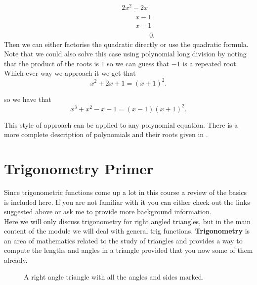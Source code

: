 \begin{warpHTML}
\begin{align*}
&\phantom{++}\underline{2x^{2}-2x}\\
&\phantom{++++}x-1\\
&\phantom{++++}\underline{x-1}\\
&\phantom{++++++}0.
\end{align*}
Then we can either factorise the quadratic directly or use the quadratic formula. Note that we could also solve this case using polynomial long division by noting that the product of the roots is $1$ so we can guess that $-1$ is a repeated root. Which ever way we approach it we get that
\begin{equation*}
x^{2}+2x+1=(x+1)^{2}.
\end{equation*}
\end{warpHTML}

so we have that
\begin{equation*}
x^{3}+x^{2}-x-1=(x-1)(x+1)^{2}.
\end{equation*}

This style of approach can be applied to any polynomial equation. There is a more complete description of polynomials and their roots given in \cite{algI}.

\section{Trigonometry Primer}
Since trigonometric functions come up a lot in this course a review of the basics is included here. If you are not familiar with it you can either check out the links suggested above or ask me to provide more background information.\\

Here we will only discuss trigonometry for right angled triangles, but in the main content of the module we will deal with general trig functions. \textbf{Trigonometry} is an area of mathematics related to the study of triangles and provides a way to compute the lengths and angles in a triangle provided that you now some of them already.

\begin{figure}[ht]
    \centering
    \caption{A right angle triangle with all the angles and sides marked.}
    \label{fig: Trig definitions}
\end{figure}


